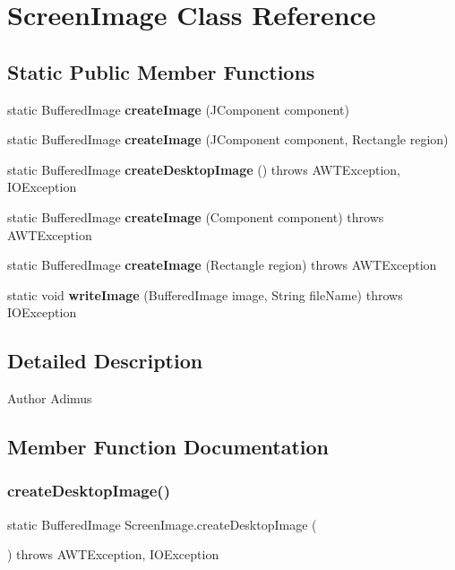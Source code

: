 \section{Screen\+Image Class Reference}
\label{class_screen_image}
\subsection*{Static Public Member Functions}
\begin{DoxyCompactItemize}
\item 
static Buffered\+Image \textbf{ create\+Image} (J\+Component component)
\item 
static Buffered\+Image \textbf{ create\+Image} (J\+Component component, Rectangle region)
\item 
static Buffered\+Image \textbf{ create\+Desktop\+Image} ()  throws A\+W\+T\+Exception, I\+O\+Exception 	
\item 
static Buffered\+Image \textbf{ create\+Image} (Component component)  throws A\+W\+T\+Exception 	
\item 
static Buffered\+Image \textbf{ create\+Image} (Rectangle region)  throws A\+W\+T\+Exception 	
\item 
static void \textbf{ write\+Image} (Buffered\+Image image, String file\+Name)  throws I\+O\+Exception 	
\end{DoxyCompactItemize}


\subsection{Detailed Description}
\begin{DoxyAuthor}{Author}
Adimus 
\end{DoxyAuthor}


\subsection{Member Function Documentation}
\mbox{\label{class_screen_image_a5474c7930746d66cad780ab238197f14}} 
\subsubsection{create\+Desktop\+Image()}
{\footnotesize\ttfamily static Buffered\+Image Screen\+Image.\+create\+Desktop\+Image (\begin{DoxyParamCaption}{ }\end{DoxyParamCaption}) throws A\+W\+T\+Exception, I\+O\+Exception\hspace{0.3cm}{\ttfamily [static]}}

